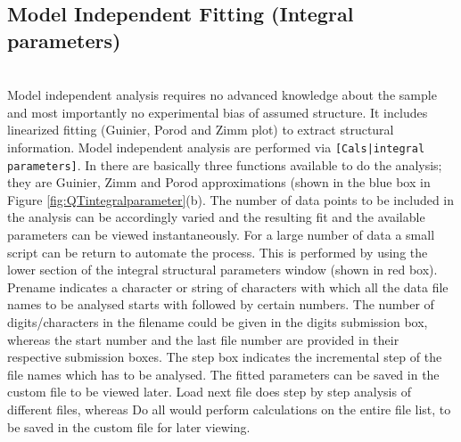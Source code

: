 \subsection{Model Independent Fitting (Integral parameters)} ~\\
Model independent analysis requires no advanced knowledge about the
sample and most importantly no experimental bias of assumed
structure. It includes linearized fitting (Guinier, Porod and Zimm
plot) to extract structural information. Model independent analysis
are performed via \verb"[Cals|integral parameters]". In \SASfit
there are basically three functions available to do the analysis;
they are Guinier, Zimm and Porod approximations (shown in the blue
box in Figure \ref{fig:QTintegralparameter}(b). The number of data points to be included in the
analysis can be accordingly varied and the resulting fit and the
available parameters can be viewed instantaneously. For a large
number of data a small script can be return to automate the process.
This is performed by using the lower section of the integral
structural parameters window (shown in red box). Prename indicates a
character or string of characters with which all the data file names
to be analysed starts with followed by certain numbers. The number
of digits/characters in the filename could be given in the digits
submission box, whereas the start number and the last file number
are provided in their respective submission boxes. The step box
indicates the incremental step of the file names which has to be
analysed. The fitted parameters can be saved in the custom file to
be viewed later. Load next file does step by step analysis of
different files, whereas Do all would perform calculations on the
entire file list, to be saved in the custom file for later viewing.

